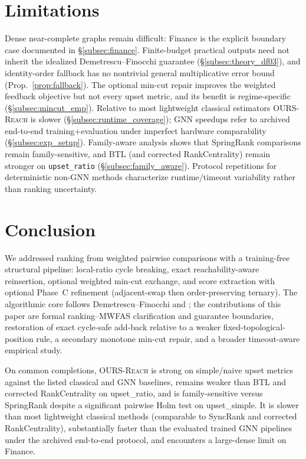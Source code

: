 \documentclass{article}
\begin{document}
\section{Limitations}
\label{sec:limitations}
Dense near-complete graphs remain difficult: Finance is the explicit boundary case documented in \S\ref{subsec:finance}.
Finite-budget practical outputs need not inherit the idealized Demetrescu--Finocchi guarantee (\S\ref{subsec:theory_df03}), and identity-order fallback has no nontrivial general multiplicative error bound (Prop.~\ref{prop:fallback}).
The optional min-cut repair improves the weighted feedback objective but not every upset metric, and its benefit is regime-specific (\S\ref{subsec:mincut_emp}).
Relative to most lightweight classical estimators \textsc{OURS-Reach} is slower (\S\ref{subsec:runtime_coverage}); GNN speedups refer to archived end-to-end training+evaluation under imperfect hardware comparability (\S\ref{subsec:exp_setup}).
Family-aware analysis shows that SpringRank comparisons remain family-sensitive, and BTL (and corrected RankCentrality) remain stronger on \texttt{upset\_ratio} (\S\ref{subsec:family_aware}).
Protocol repetitions for deterministic non-GNN methods characterize runtime/timeout variability rather than ranking uncertainty.

\section{Conclusion}
\label{sec:conclusion}
We addressed ranking from weighted pairwise comparisons with a training-free structural pipeline: local-ratio cycle breaking, exact reachability-aware reinsertion, optional weighted min-cut exchange, and score extraction with optional Phase~C refinement (adjacent-swap then order-preserving ternary).
The algorithmic core follows Demetrescu--Finocchi and \citet{VK25}; the contributions of this paper are formal ranking--MWFAS clarification and guarantee boundaries, restoration of exact cycle-safe add-back relative to a weaker fixed-topological-position rule, a secondary monotone min-cut repair, and a broader timeout-aware empirical study.

On common completions, \textsc{OURS-Reach} is strong on simple/naive upset metrics against the listed classical and GNN baselines, remains weaker than BTL and corrected RankCentrality on upset\_ratio, and is family-sensitive versus SpringRank despite a significant pairwise Holm test on upset\_simple.
It is slower than most lightweight classical methods (comparable to SyncRank and corrected RankCentrality), substantially faster than the evaluated trained GNN pipelines under the archived end-to-end protocol, and encounters a large-dense limit on Finance.
\end{document}
